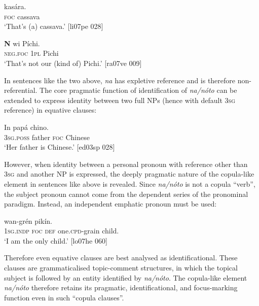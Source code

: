 \ea%
    \label{ex:key:766}
    \gll {} kasára.\\
\textsc{foc}  cassava\\

\glt ‘That’s (a) cassava.’ [li07pe 028]
\z


\ea%
    \label{ex:key:767}
    \gll \textbf{N}  wi  Píchi.\\
\textsc{neg.foc}  \textsc{1pl}  Pichi\\

\glt ‘That’s not our (kind of) Pichi.’ [ra07ve 009]
\z

In sentences like the two above, \textit{na} has expletive reference and is therefore non-referential. The core pragmatic function of identification of \textit{na}\textit{\textup{/}}\textit{nóto} can be extended to express identity between two full NPs (hence with default \textsc{3sg} reference) in equative clauses: 


\ea%
    \label{ex:key:768}
    \gll In    papá   chino.\\
\textsc{3sg.poss}  father  \textsc{foc}  Chinese\\

\glt ‘Her father is Chinese.’ [ed03sp 028]
\z

However, when identity between a personal pronoun with reference other than \textsc{3sg} and another NP is expressed, the deeply pragmatic nature of the copula-like element in sentences like  above is revealed. Since \textit{na}\textit{\textup{/}}\textit{nóto} is not a copula “verb”, the subject pronoun cannot come from the dependent series of the pronominal paradigm. Instead, an independent emphatic pronoun must be used: 


\ea
	\label{ex:key:769}
	\gll
{}       wan-grén  pikín.\\
\textsc{1sg.indp}  \textsc{foc}  \textsc{def}  one.\textsc{cpd}{}-grain  child.\\

\glt ‘I am the only child.’ [lo07he 060]
\z

Therefore even equative clauses are best analysed as identificational. These clauses are grammaticalised topic-comment structures, in which the topical subject is followed by an entity identified by \textit{na}\textit{\textup{/}}\textit{nóto}. The copula-like element \textit{na}\textit{\textup{/}}\textit{nóto} therefore retains its pragmatic, identificational, and focus-marking function even in such “copula clauses”. 


